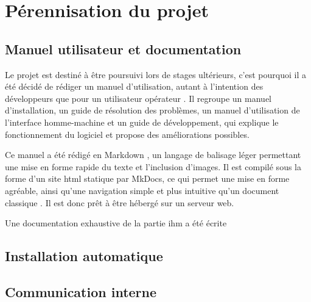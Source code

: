 	\section{Pérennisation du projet}
	
		\subsection{Manuel utilisateur et documentation}
		\label{sub:manuel}

			Le projet est destiné à être poursuivi lors de stages ultérieurs, c'est pourquoi il a été décidé de rédiger un manuel d'utilisation, autant à l'intention des développeurs que pour un utilisateur \og opérateur \fg{}. Il regroupe un manuel d'installation, un guide de résolution des problèmes, un manuel d'utilisation de l'interface homme-machine et un guide de développement, qui explique le fonctionnement du logiciel et propose des améliorations possibles.
			\par
			Ce manuel a été rédigé en Markdown \cite{markdown}, un langage de balisage léger permettant une mise en forme rapide du texte et l'inclusion d'images. Il est compilé sous la forme d'un site html statique par MkDocs\cite{mkdocs}, ce qui permet une mise en forme agréable, ainsi qu'une navigation simple et plus intuitive qu'un document \og classique \fg{}. Il est donc prêt à être hébergé sur un serveur web.
			\par
			Une documentation exhaustive de la partie \gls{ihm} a été écrite
			
		\subsection{Installation automatique}
		
				
		\subsection{Communication interne}
		

